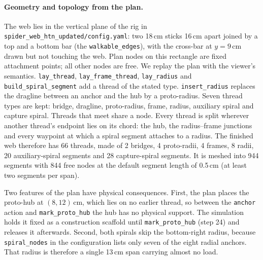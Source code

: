 \paragraph{Geometry and topology from the plan.}
The web lies in the vertical plane of the rig in \texttt{spider\_web\_htn\_updated/config.yaml}: two 18\,cm sticks
16\,cm apart joined by a top and a bottom bar (the \texttt{walkable\_edges}), with the cross-bar at $y=9$\,cm drawn
but not touching the web. Plan nodes on this rectangle are fixed attachment points; all other nodes are free. We replay
the plan with the viewer's semantics. \texttt{lay\_thread}, \texttt{lay\_frame\_thread}, \texttt{lay\_radius} and
\texttt{build\_spiral\_segment} add a thread of the stated type. \texttt{insert\_radius} replaces the dragline between
an anchor and the hub by a proto-radius. Seven thread types are kept: bridge, dragline, proto-radius, frame, radius,
auxiliary spiral and capture spiral. Threads that meet share a node. Every thread is split wherever another thread's
endpoint lies on its chord: the hub, the radius--frame junctions and every waypoint at which a spiral segment
attaches to a radius. The finished web therefore has 66 threads, made of 2 bridges, 4 proto-radii, 4 frames,
8 radii, 20 auxiliary-spiral segments and 28 capture-spiral segments. It is meshed into 944 segments with 844 free
nodes at the default segment length of 0.5\,cm (at least two segments per span).

Two features of the plan have physical consequences. First, the plan places the proto-hub at $(8,12)$\,cm, which lies
on no earlier thread, so between the \texttt{anchor} action and \texttt{mark\_proto\_hub} the hub has no physical
support. The simulation holds it fixed as a construction scaffold until \texttt{mark\_proto\_hub} (step 24) and
releases it afterwards. Second, both spirals skip the bottom-right radius, because \texttt{spiral\_nodes} in the
configuration lists only seven of the eight radial anchors. That radius is therefore a single 13\,cm span carrying
almost no load.

